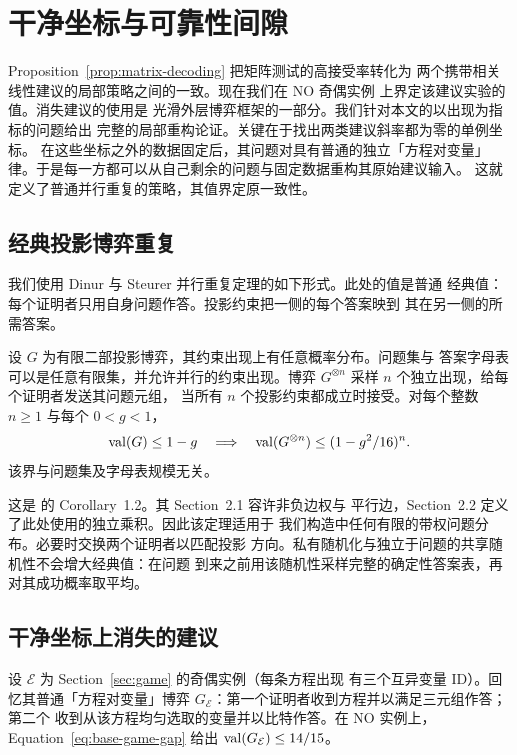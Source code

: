 \section{干净坐标与可靠性间隙}
\label{sec:clean}

Proposition~\ref{prop:matrix-decoding} 把矩阵测试的高接受率转化为
两个携带相关线性建议的局部策略之间的一致。现在我们在 NO 奇偶实例
上界定该建议实验的值。消失建议的使用是 \cite[Sections~3.3--3.4]{KMS17}
光滑外层博弈框架的一部分。我们针对本文的以出现为指标的问题给出
完整的局部重构论证。关键在于找出两类建议斜率都为零的单例坐标。
在这些坐标之外的数据固定后，其问题对具有普通的独立「方程对变量」
律。于是每一方都可以从自己剩余的问题与固定数据重构其原始建议输入。
这就定义了普通并行重复的策略，其值界定原一致性。

\subsection{经典投影博弈重复}

我们使用 Dinur 与 Steurer 并行重复定理的如下形式。此处的值是普通
经典值：每个证明者只用自身问题作答。投影约束把一侧的每个答案映到
其在另一侧的所需答案。

\begin{theorem}[投影博弈重复]
\label{thm:repetition}
设 $G$ 为有限二部投影博弈，其约束出现上有任意概率分布。问题集与
答案字母表可以是任意有限集，并允许并行的约束出现。博弈
$G^{\otimes n}$ 采样 $n$ 个独立出现，给每个证明者发送其问题元组，
当所有 $n$ 个投影约束都成立时接受。对每个整数 $n\ge1$ 与每个
$0<g<1$，
\begin{equation}
 \operatorname{val}(G)\le 1-g
 \quad\Longrightarrow\quad
 \operatorname{val}(G^{\otimes n})\le (1-g^2/16)^n.
 \label{eq:projection-repetition}
\end{equation}
该界与问题集及字母表规模无关。
\end{theorem}

这是 \cite{DS14} 的 Corollary~1.2。其 Section~2.1 容许非负边权与
平行边，Section~2.2 定义了此处使用的独立乘积。因此该定理适用于
我们构造中任何有限的带权问题分布。必要时交换两个证明者以匹配投影
方向。私有随机化与独立于问题的共享随机性不会增大经典值：在问题
到来之前用该随机性采样完整的确定性答案表，再对其成功概率取平均。

\subsection{干净坐标上消失的建议}

设 $\mathcal E$ 为 Section~\ref{sec:game} 的奇偶实例（每条方程出现
有三个互异变量 ID）。回忆其普通「方程对变量」博弈
$G_{\mathcal E}$：第一个证明者收到方程并以满足三元组作答；第二个
收到从该方程均匀选取的变量并以比特作答。在 NO 实例上，
Equation~\eqref{eq:base-game-gap} 给出
$\operatorname{val}(G_{\mathcal E})\le14/15$。

